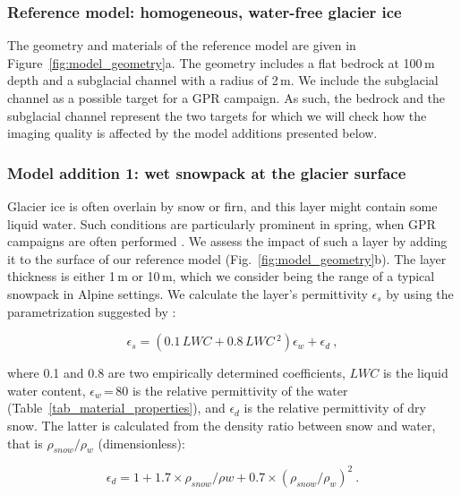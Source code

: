 \subsubsection{Reference model: homogeneous, water-free glacier ice}
\label{sec:ref_model}

The geometry and materials of the reference model are given in Figure~\ref{fig:model_geometry}a. The geometry includes a flat bedrock at 100\,m depth and a subglacial channel with a radius of 2\,m. We include the subglacial channel as a possible target for a GPR campaign. As such, the bedrock and the subglacial channel represent the two targets for which we will check how the imaging quality is affected by the model additions presented below. 


\subsubsection{Model addition 1: wet snowpack at the glacier surface}
\label{sec:snow}

Glacier ice is often overlain by snow or firn, and this layer might contain some liquid water. Such conditions are particularly prominent in spring, when GPR campaigns are often performed \citep[e.g.][]{Bauder&al2018}. We assess the impact of such a layer by adding it to the surface of our reference model (Fig.~\ref{fig:model_geometry}b). The layer thickness is either 1\,m or 10\,m, which we consider being the range of a typical snowpack in Alpine settings. We calculate the layer's permittivity $\epsilon_s$ by using the parametrization suggested by \cite{Tiuri&al1984}: 

\begin{equation}
      \epsilon_s = (0.1\,LWC + 0.8\,LWC\,^2)\epsilon_w + \epsilon_d~,
       \label{eq:epsilon_wet}
\end{equation}

where 0.1 and 0.8 are two empirically determined coefficients, $LWC$ is the liquid water content, $\epsilon_w$\,=\,80 is the relative permittivity of the water (Table~\ref{tab_material_properties}), and $\epsilon_d$ is the relative permittivity of dry snow. The latter is calculated from the density ratio between snow and water, that is $\rho_{snow}/\rho_{w}$ (dimensionless): 

\begin{equation}
  \epsilon_d = 1 + 1.7\times\rho_{snow}/\rho{w} + 0.7\times(\rho_{snow}/\rho_{w})^2~.
  \label{eq:epsilon_dry}
\end{equation}

